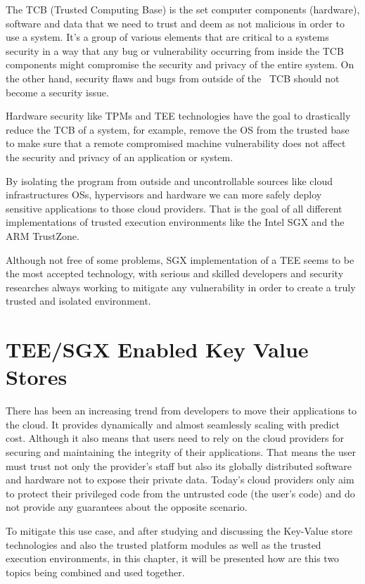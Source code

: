 The \gls{TCB} (Trusted Computing Base) is the set computer components (hardware), software and data that we need to trust and deem as not malicious in order to use a system. It's a group of various elements that are critical to a systems security in a way that any bug or vulnerability occurring from inside the \gls{TCB} components might compromise the security and privacy of the entire system. On the other hand, security flaws and bugs from outside of the ~\gls{TCB} should not become a security issue.

Hardware security like \glspl{TPM} and \gls{TEE} technologies have the goal to drastically reduce the \gls{TCB} of a system, for example, remove the \gls{OS} from the trusted base to make sure that a remote compromised machine vulnerability does not affect the security and privacy of an application or system.

By isolating the program from outside and uncontrollable sources like cloud infrastructures \glspl{OS}, hypervisors and hardware we can more safely deploy sensitive applications to those cloud providers.
That is the goal of all different implementations of trusted execution environments like the Intel \gls{SGX} and the ARM TrustZone.

Although not free of some problems, \gls{SGX} implementation of a \gls{TEE} seems to be the most accepted technology, with serious and skilled developers and security researches always working to mitigate any vulnerability in order to create a truly trusted and isolated environment.

\section{TEE/SGX Enabled Key Value Stores} %
\label{sec:sgx_enabled_key_value_stores}

There has been an increasing trend from developers to move their applications to the cloud. It provides dynamically and almost seamlessly scaling with predict cost. Although it also means that users need to rely on the cloud providers for securing and maintaining the integrity of their applications. That means the user must trust not only the provider's staff but also its globally distributed software and hardware not to expose their private data. Today's cloud providers only aim to protect their privileged code from the untrusted code (the user's code) and do not provide any guarantees about the opposite scenario.

To mitigate this use case, and after studying and discussing the Key-Value store technologies and also the trusted platform modules as well as the trusted execution environments, in this chapter, it will be presented how are this two topics being combined and used together. 

